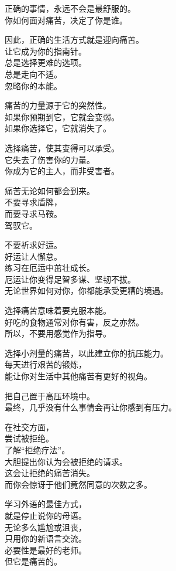 \documentclass[
]{article}
\begin{document}
正确的事情，永远不会是最舒服的。\\
你如何面对痛苦，决定了你是谁。

因此，正确的生活方式就是迎向痛苦。\\
让它成为你的指南针。\\
总是选择更难的选项。\\
总是走向不适。\\
忽略你的本能。

痛苦的力量源于它的突然性。\\
如果你预期到它，它就会变弱。\\
如果你选择它，它就消失了。

选择痛苦，使其变得可以承受。\\
它失去了伤害你的力量。\\
你成为它的主人，而非受害者。

痛苦无论如何都会到来。\\
不要寻求盾牌，\\
而要寻求马鞍。\\
驾驭它。

不要祈求好运。\\
好运让人懈怠。\\
练习在厄运中茁壮成长。\\
厄运让你变得足智多谋、坚韧不拔。\\
无论世界如何对你，你都能承受更糟的境遇。

选择痛苦意味着要克服本能。\\
好吃的食物通常对你有害，反之亦然。\\
所以，不要用感觉作为指导。

选择小剂量的痛苦，以此建立你的抗压能力。\\
每天进行艰苦的锻炼，\\
能让你对生活中其他痛苦有更好的视角。

把自己置于高压环境中。\\
最终，几乎没有什么事情会再让你感到有压力。

在社交方面，\\
尝试被拒绝。\\
了解``拒绝疗法''。\\
大胆提出你认为会被拒绝的请求。\\
这会让拒绝的痛苦消失。\\
而你会惊讶于他们竟然同意的次数之多。

学习外语的最佳方式，\\
就是停止说你的母语。\\
无论多么尴尬或沮丧，\\
只用你的新语言交流。\\
必要性是最好的老师。\\
但它是痛苦的。
\end{document}
